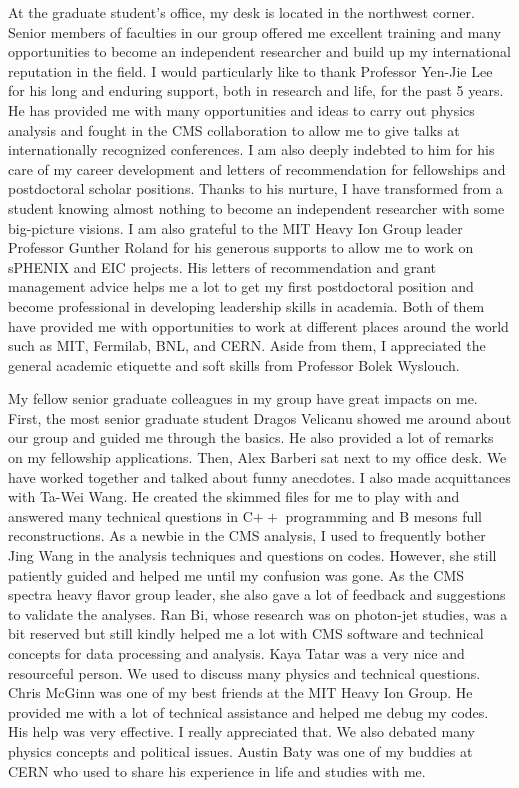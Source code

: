 At the graduate student's office, my desk is located in the northwest corner. Senior members of faculties in our group offered me excellent training and many opportunities to become an independent researcher and build up my international reputation in the field. I would particularly like to thank Professor Yen-Jie Lee for his long and enduring support, both in research and life, for the past 5 years. He has provided me with many opportunities and ideas to carry out physics analysis and fought in the CMS collaboration to allow me to give talks at internationally recognized conferences. I am also deeply indebted to him for his care of my career development and letters of recommendation for fellowships and postdoctoral scholar positions. Thanks to his nurture, I have transformed from a student knowing almost nothing to become an independent researcher with some big-picture visions. I am also grateful to the MIT Heavy Ion Group leader Professor Gunther Roland for his generous supports to allow me to work on sPHENIX and EIC projects. His letters of recommendation and grant management advice helps me a lot to get my first postdoctoral position and become professional in developing leadership skills in academia. Both of them have provided me with opportunities to work at different places around the world such as MIT, Fermilab, BNL, and CERN. Aside from them, I appreciated the general academic etiquette and soft skills from Professor Bolek Wyslouch.


My fellow senior graduate colleagues in my group have great impacts on me. First, the most senior graduate student Dragos Velicanu showed me around about our group and guided me through the basics. He also provided a lot of remarks on my fellowship applications. Then, Alex Barberi sat next to my office desk. We have worked together and talked about funny anecdotes. I also made acquittances with Ta-Wei Wang. He created the skimmed files for me to play with and answered many technical questions in C$++$ programming and B mesons full reconstructions. As a newbie in the CMS analysis, I used to frequently bother Jing Wang in the analysis techniques and questions on codes. However, she still patiently guided and helped me until my confusion was gone. As the CMS spectra heavy flavor group leader, she also gave a lot of feedback and suggestions to validate the analyses. Ran Bi, whose research was on photon-jet studies, was a bit reserved but still kindly helped me a lot with CMS software and technical concepts for data processing and analysis. Kaya Tatar was a very nice and resourceful person. We used to discuss many physics and technical questions. Chris McGinn was one of my best friends at the MIT Heavy Ion Group. He provided me with a lot of technical assistance and helped me debug my codes. His help was very effective. I really appreciated that. We also debated many physics concepts and political issues. Austin Baty was one of my buddies at CERN who used to share his experience in life and studies with me.  

